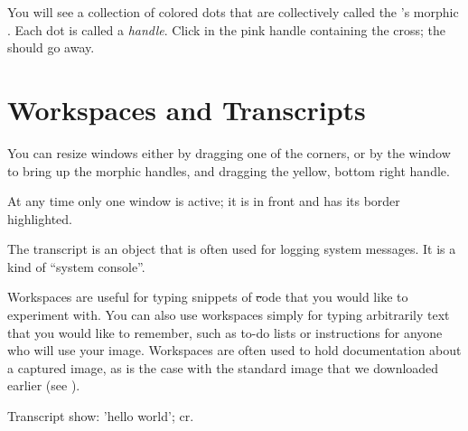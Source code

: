 \documentclass[a4paper,10pt,twoside]{book}
\begin{document}
You will see a collection of colored dots that are collectively called the \bam's morphic .
Each dot is called a \emph{handle}.
Click in the pink handle containing the cross; the \bam should go away. 

\section{Workspaces and Transcripts}
\label{sec:transcript}


You can resize windows either by dragging one of the corners, or by  the window to bring up the morphic handles, and dragging the yellow, bottom right handle.

At any time only one window is active; it is in front and has its border highlighted.

The transcript is an object that is often used for logging system messages.
It is a kind of ``system console''.

Workspaces are useful for typing snippets of \st code that you would like to experiment with.
You can also use workspaces simply for typing arbitrarily text that you would like to remember, such as to-do lists or instructions for anyone who will use your image.
Workspaces are often used to hold documentation about a captured image, as is the case with the standard image that we downloaded earlier (see ).

\begin{code}{}
Transcript show: 'hello world'; cr.
\end{code}
\end{document}
